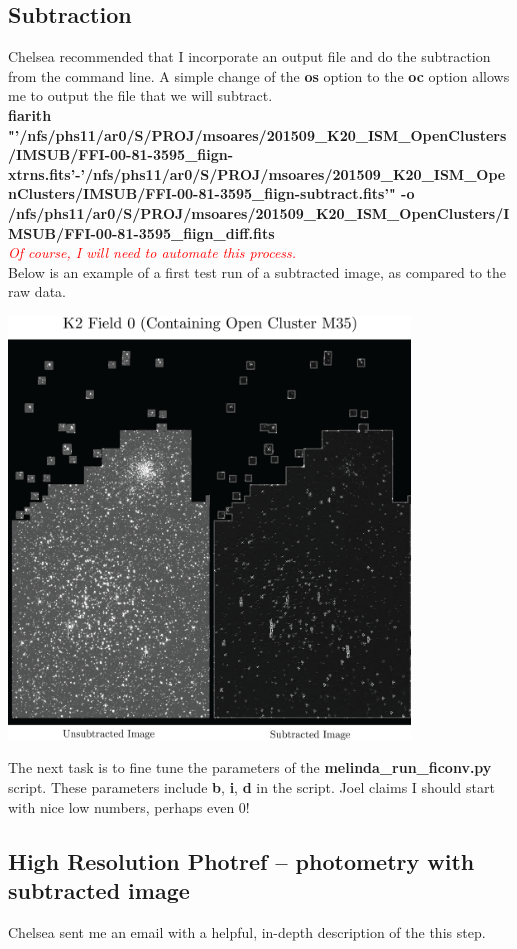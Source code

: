 \documentclass[11pt,letterpaper]{book} %
\begin{document}
\subsection*{Subtraction}
Chelsea recommended that I incorporate an output file and do the subtraction from the command line. A simple change of the \textbf{os} option to the \textbf{oc} option allows me to output the file that we will subtract. \\
\textbf{fiarith "'/nfs/phs11/ar0/S/PROJ/msoares/201509\_K20\_ISM\_OpenClusters/IMSUB/FFI-00-81-3595\_fiign-xtrns.fits'-'/nfs/phs11/ar0/S/PROJ/msoares/201509\_K20\_ISM\_OpenClusters/IMSUB/FFI-00-81-3595\_fiign-subtract.fits'" -o /nfs/phs11/ar0/S/PROJ/msoares/201509\_K20\_ISM\_OpenClusters/IMSUB/FFI-00-81-3595\_fiign\_diff.fits}\\
\textcolor{red}{\textit{Of course, I will need to automate this process.}}\\
Below is an example of a first test run of a subtracted image, as compared to the raw data.
\begin{center}
\includegraphics[width=0.8\textwidth]{Figure1Proposal.png}
\end{center}

The next task is to fine tune the parameters of the \textbf{melinda\_run\_ficonv.py} script. These parameters include \textbf{b}, \textbf{i}, \textbf{d} in the script. Joel claims I should start with nice low numbers, perhaps even 0! 

\subsection*{High Resolution Photref -- photometry with subtracted image}
Chelsea sent me an email with a helpful, in-depth description of the this step.\\  
\end{document}
